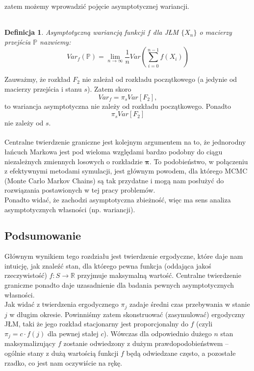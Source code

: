 \documentclass[a4paper]{article}
\theoremstyle{defn}
\newtheorem{defn}{Definicja}[subsection]
\theoremstyle{theorem}
\theoremstyle{lemma}
\theoremstyle{cor}
\theoremstyle{fact}
\begin{document}
zatem możemy wprowadzić pojęcie asymptotycznej wariancji.\\\\
\begin{defn}\label{defn2.6.6}
Asymptotyczną wariancją funkcji $f$ dla JŁM $\{X_n\}$ o macierzy przejścia $\mathbb{P}$ nazwiemy:
$$Var_{f}(\mathbb{P}) = \lim\limits_{n \to \infty} \frac{1}{n} Var\left(\sum\limits_{i=0}^{n-1} f(X_i)\right)$$
\end{defn}
Zauważmy, że rozkład $F_2$ nie zależał od rozkładu początkowego (a jedynie od macierzy przejścia i stanu $s$). Zatem skoro $$Var_f = \pi_s Var[F_2],$$
to wariancja asymptotyczna nie zależy od rozkładu początkowego. Ponadto
$$\pi_s Var[F_2]$$
nie zależy od $s$.\\\\
Centralne twierdzenie graniczne jest kolejnym argumentem na to, że jednorodny łańcuch Markowa jest pod wieloma względami bardzo podobny do ciągu niezależnych zmiennych losowych o rozkładzie $\boldsymbol{\pi}$. To podobieństwo, w połączeniu z efektywnymi metodami symulacji, jest głównym powodem, dla którego MCMC (Monte Carlo Markov Chains) są tak przydatne i mogą nam posłużyć do rozwiązania postawionych w tej pracy problemów.\\

Ponadto widać, że zachodzi asymptotyczna zbieżność, więc ma sens analiza asymptotycznych własności (np. wariancji).
\subsection{Podsumowanie}
\label{sect2.7}
Głównym wynikiem tego rozdziału jest twierdzenie ergodyczne, które daje nam intuicję, jak znaleźć stan, dla którego pewna funkcja (oddająca jakoś rzeczywistość) $f: S \rightarrow \mathbb{R}$ przyjmuje maksymalną wartość. Centralne twierdzenie graniczne ponadto daje uzasadnienie dla badania pewnych asymptotycznych własności.\\

Jak widać z twierdzenia ergodycznego $\pi_j$ zadaje średni czas przebywania w stanie $j$ w długim okresie. Powinniśmy zatem skonstruować (zasymulować) ergodyczny JŁM, taki że jego rozkład stacjonarny jest proporcjonalny do $f$ (czyli $\pi_j = c \cdot f(j)$ dla pewnej stałej $c$). Wówczas dla odpowiednio dużego $n$ stan maksymalizujący $f$ zostanie odwiedzony z dużym prawdopodobieństwem – ogólnie stany z dużą wartością funkcji $f$ będą odwiedzane często, a pozostałe rzadko, co jest nam oczywiście na rękę.
\\
\end{document}
